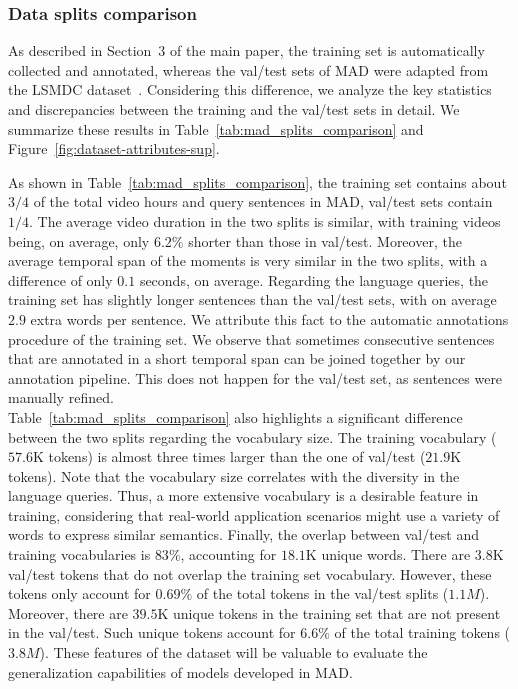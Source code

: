 \documentclass[10pt,twocolumn,letterpaper]{article}
\begin{document}
\subsubsection{Data splits comparison}
As described in Section~3 of the main paper, the training set is automatically collected and annotated, whereas the val/test sets of MAD were adapted from the LSMDC dataset~\cite{rohrbach2017movie}. Considering this difference, we analyze the key statistics and discrepancies between the training and the val/test sets in detail. We summarize these results in Table~\ref{tab:mad_splits_comparison} and Figure~\ref{fig:dataset-attributes-sup}.

As shown in Table~\ref{tab:mad_splits_comparison}, the training set contains about $3/4$ of the total video hours and query sentences in MAD, val/test sets contain $1/4$. The average video duration in the two splits is similar, with training videos being, on average, only $6.2\%$ shorter than those in val/test.
Moreover, the average temporal span of the moments is very similar in the two splits, with a difference of only $0.1$ seconds, on average. Regarding the language queries, the training set has slightly longer sentences than the val/test sets, with on average $2.9$ extra words per sentence. We attribute this fact to the automatic annotations procedure of the training set. We observe that sometimes consecutive sentences that are annotated in a short temporal span can be joined together by our annotation pipeline. This does not happen for the val/test set, as sentences were manually refined. \\

Table~\ref{tab:mad_splits_comparison} also highlights a significant difference between the two splits regarding the vocabulary size. The training vocabulary ($57.6$K tokens) is almost three times larger than the one of val/test ($21.9$K tokens). Note that the vocabulary size correlates with the diversity in the language queries. Thus, a more extensive vocabulary is a desirable feature in training, considering that real-world application scenarios might use a variety of words to express similar semantics. 
Finally, the overlap between val/test and training vocabularies is $83\%$, accounting for $18.1$K unique words. 
There are $3.8$K val/test tokens that do not overlap the training set vocabulary. However, these tokens only account for $0.69\%$ of the total tokens in the val/test splits ($1.1M$). 
Moreover, there are $39.5$K unique tokens in the training set that are not present in the val/test. Such unique tokens account for $6.6\%$ of the total training tokens ($3.8M$).  
These features of the dataset will be valuable to evaluate the generalization capabilities of models developed in MAD.
\end{document}
